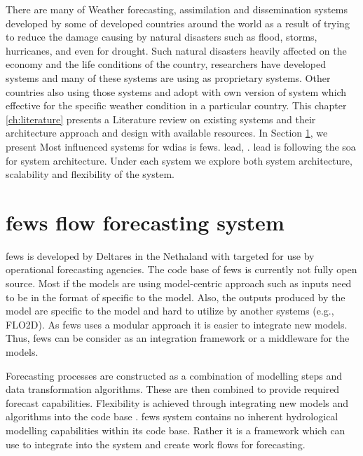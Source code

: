 There are many of Weather forecasting, assimilation and dissemination systems developed by some of developed countries around the world as a result of trying to reduce the damage causing by natural disasters such as flood, storms, hurricanes, and even for drought.
Such natural disasters heavily affected on the economy and the life conditions of the country, researchers have developed systems and many of these systems are using as proprietary systems. Other countries also using those systems and adopt with own version of system which effective for the specific weather condition in a particular country.
This chapter \ref{ch:literature} presents a Literature review on existing systems and their architecture approach and design with available resources.
In Section \ref{se:fews}, we present Most influenced systems for \acrshort{wdias} is \acrshort{fews}. \acrfull{lead}, . \acrshort{lead} is following the \acrfull{soa} for system architecture.
Under each system we explore both system architecture, scalability and flexibility of the system.




\section{\acrshort{fews} flow forecasting system}
\label{se:fews}

\acrshort{fews} \cite{Werner2013TheSystem} is developed by Deltares in the Nethaland with targeted for use by operational forecasting agencies. The code base of \acrshort{fews} is currently not fully open source.
Most if the models are using model-centric approach such as inputs need to be in the format of specific to the model. Also, the outputs produced by the model are specific to the model and hard to utilize by another systems (e.g., FLO2D). As \acrshort{fews} uses a modular approach it is easier to integrate new models. 
Thus, \acrshort{fews} can be consider as an integration framework or a middleware for the models.

Forecasting processes are constructed as a combination of modelling steps and data transformation algorithms. These are then combined to provide required forecast capabilities. Flexibility is achieved through integrating new models and algorithms into the code base \cite{Werner2013TheSystem}. \acrshort{fews} system contains no inherent hydrological modelling capabilities within its code base. Rather it is a framework which can use to integrate into the system and create work flows for forecasting.

